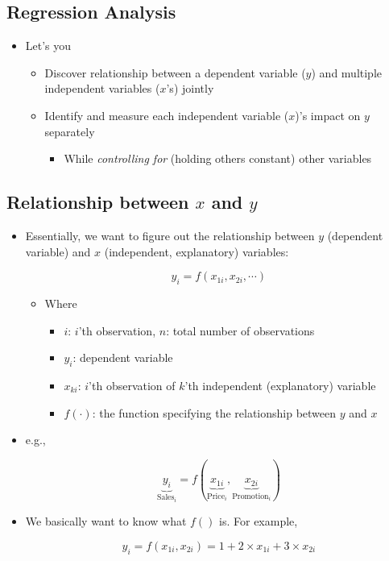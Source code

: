 \documentclass[10pt,article]{article}
\begin{document}
\subsection{Regression Analysis}
\label{sec:orge70bc4a}
\begin{itemize}
\item Let's you

\begin{itemize}
\item Discover relationship between a dependent variable (\(y\)) and 
multiple independent variables (\(x\)'s) jointly
\item Identify and measure each independent variable (\(x\))'s impact on 
\(y\) separately 
\begin{itemize}
\item While \emph{controlling for} (holding others constant) other variables
\end{itemize}
\end{itemize}
\end{itemize}

\subsection{Relationship between \(x\) and \(y\)}
\label{sec:orgebe5628}
\begin{itemize}
\item Essentially, we want to figure out the relationship between \(y\)
(dependent variable) and \(x\) (independent, explanatory) variables:

\[ y_i = f(x_{1i}, x_{2i}, \cdots) \]

\begin{itemize}
\item Where

\begin{itemize}
\item \(i\): \(i\)'th observation, \(n\): total number of observations
\item \(y_i\): dependent variable
\item \(x_{ki}\): \(i\)'th observation of \(k\)'th independent
(explanatory) variable
\item \(f(\cdot)\): the function specifying the relationship between \(y\)
and \(x\)
\end{itemize}
\end{itemize}
\end{itemize}

\begin{itemize}
\item e.g.,

\[ \underbrace{y_{i}}_{\text{Sales}_i} = f(\underbrace{x_{
  1i}}_{\text{Price}_i}, \underbrace{x_{2i}}_{\text{Promotion}_i}) \]

\item We basically want to know what \(f()\) is. For example,

\[ y_{i} = f(x_{1i}, x_{2i}) = 1 + 2 \times x_{1i}  + 3 \times x_{2i} \]
\end{itemize}
\end{document}
